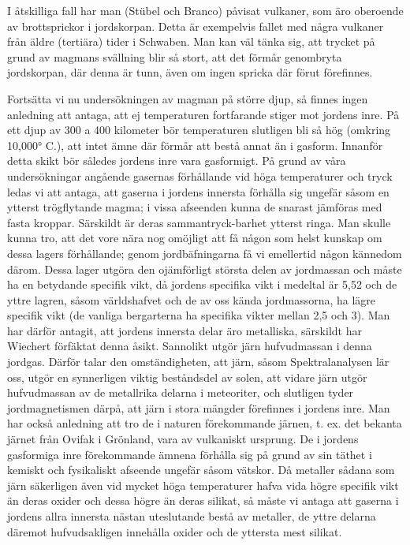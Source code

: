 \documentclass[a4paper, 12pt, oneside, swedish]{article}
\begin{document}
I åtskilliga fall har man (Stübel och Branco) påvisat vulkaner, som äro oberoende av brottsprickor i jordskorpan. Detta är exempelvis fallet med några vulkaner från äldre (tertiära) tider i Schwaben. Man kan väl tänka sig, att trycket på grund av magmans svällning blir så stort, att det förmår genombryta jordskorpan, där denna är tunn, även om ingen spricka där förut förefinnes.

Fortsätta vi nu undersökningen av magman på större djup, så finnes ingen anledning att antaga, att ej temperaturen fortfarande stiger mot jordens inre. På ett djup av 300 a 400 kilometer bör temperaturen slutligen bli så hög (omkring 10,000° C.), att intet ämne där förmår att bestå annat än i gasform. Innanför detta skikt bör således jordens inre vara gasformigt. På grund av våra undersökningar angående gasernas förhållande vid höga temperaturer och tryck ledas vi att antaga, att gaserna i jordens innersta förhålla sig ungefär såsom en ytterst trögflytande magma; i vissa afseenden kunna de snarast jämföras med fasta kroppar. Särskildt är deras sammantryck-barhet ytterst ringa. Man skulle kunna tro, att det vore nära nog omöjligt att få någon som helst kunskap om dessa lagers förhållande; genom jordbäfningarna få vi emellertid någon kännedom därom. Dessa lager utgöra den ojämförligt största delen av jordmassan och måste ha en betydande specifik vikt, då jordens specifika vikt i medeltal är 5,52 och de yttre lagren, såsom världshafvet och de av oss kända jordmassorna, ha lägre specifik vikt (de vanliga bergarterna ha specifika vikter mellan 2,5 och 3). Man har därför antagit, att jordens innersta delar äro metalliska, särskildt har Wiechert förfäktat denna åsikt. Sannolikt utgör järn hufvudmassan i denna jordgas. Därför talar den omständigheten, att järn, såsom Spektralanalysen lär oss, utgör en synnerligen viktig beståndsdel av solen, att vidare järn utgör hufvudmassan av de metallrika delarna i meteoriter, och slutligen tyder jordmagnetismen därpå, att järn i stora mängder förefinnes i jordens inre. Man har också anledning att tro de i naturen förekommande järnen, t. ex. det bekanta järnet från Ovifak i Grönland, vara av vulkaniskt ursprung. De i jordens gasformiga inre förekommande ämnena förhålla sig på grund av sin täthet i kemiskt och fysikaliskt afseende ungefär såsom vätskor. Då metaller sådana som järn säkerligen även vid mycket höga temperaturer hafva vida högre specifik vikt än deras oxider och dessa högre än deras silikat, så måste vi antaga att gaserna i jordens allra innersta nästan uteslutande bestå av metaller, de yttre delarna däremot hufvudsakligen innehålla oxider och de yttersta mest silikat.
\end{document}
